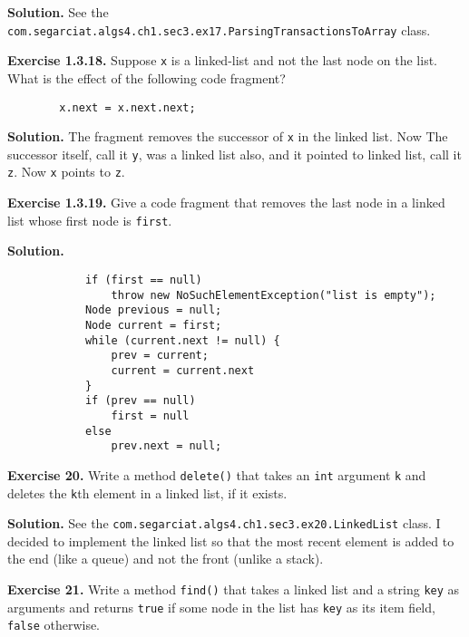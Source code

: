 \documentclass[12pt, a4paper]{article}
\newenvironment{ex}[2][Exercise]
{\par\medskip\noindent \textbf{#1 #2.}}
{\medskip}
\newenvironment{sol}[1][Solution]
{\par\medskip\noindent \textbf{#1.} }
{\medskip}
\begin{document}
	\begin{sol}
		See the \texttt{com.segarciat.algs4.ch1.sec3.ex17.ParsingTransactionsToArray} class.
	\end{sol}
	\begin{ex}{1.3.18}
		Suppose \texttt{x} is a linked-list and not the last node on the list. What is
		the effect of the following code fragment?
		\begin{lstlisting}
		x.next = x.next.next;
		\end{lstlisting}
	\end{ex}
	\begin{sol}
		The fragment removes the successor of \texttt{x} in the linked list. Now
		The successor itself, call it \texttt{y}, was a linked list also,  and
		it pointed to linked list, call it \texttt{z}. Now \texttt{x} points to
		\texttt{z}.
	\end{sol}
	\begin{ex}{1.3.19}
		Give a code fragment that removes the last node in a linked list whose first
		node is \texttt{first}.
	\end{ex}
	\begin{sol}
		\begin{lstlisting}
			if (first == null)
				throw new NoSuchElementException("list is empty");
			Node previous = null;
			Node current = first;
			while (current.next != null) {
				prev = current;
				current = current.next
			}
			if (prev == null)
				first = null
			else
				prev.next = null;
		\end{lstlisting}
	\end{sol}
	\begin{ex}{20}
		Write a method \texttt{delete()} that takes an \texttt{int} argument \texttt{k}
		and deletes the \texttt{k}th element in a linked list, if it exists.
	\end{ex}
	\begin{sol}
		See the \texttt{com.segarciat.algs4.ch1.sec3.ex20.LinkedList} class. I decided
		to implement the linked list so that the most recent element is added to the end
		(like a queue) and not the front (unlike a stack).
	\end{sol}
	\begin{ex}{21}
		Write a method \texttt{find()} that takes a linked list and a string \texttt{key}
		as arguments and returns \texttt{true} if some node in the list has \texttt{key}
		as its item field, \texttt{false} otherwise.
	\end{ex}
\end{document}
